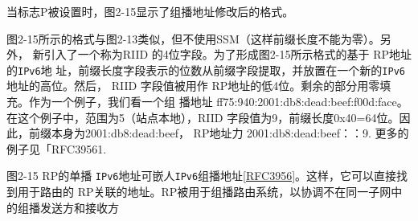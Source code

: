 当标志P被设置时，图2-15显示了组播地址修改后的格式。

图2-15所示的格式与图2-13类似，但不使用SSM（这样前缀长度不能为零）。另外，
新引入了一个称为RIID 的4位字段。为了形成图2-15所示格式的基于 RP地址的\verb|IPv6|地
址，前缀长度字段表示的位数从前缀字段提取，并放置在一个新的\verb|IPv6|地址的高位。然后，
RIID 字段值被用作 RP地址的低4位。剩余的部分用零填充。作为一个例子，我们看一个组
播地址 ff75:940:2001:db8:dead:beef:f00d:face。在这个例子中，范围为5（站点本地），RIID
字段值为9，前缀长度0x40=64位。因此，前缀本身为2001:db8:dead:beef， RP地址力
2001:db8:dead:beef：：9. 更多的例子见「RFC39561.

图2-15 RP的单播 \verb|IPv6|地址可嵌人\verb|IPv6|组播地址\href{https://www.rfc-editor.org/rfc/rfc3956}{[RFC3956]}。这样，它可以直接找到用于路由的
RP关联的地址。RP被用于组播路由系统，以协调不在同一子网中的组播发送方和接收方

